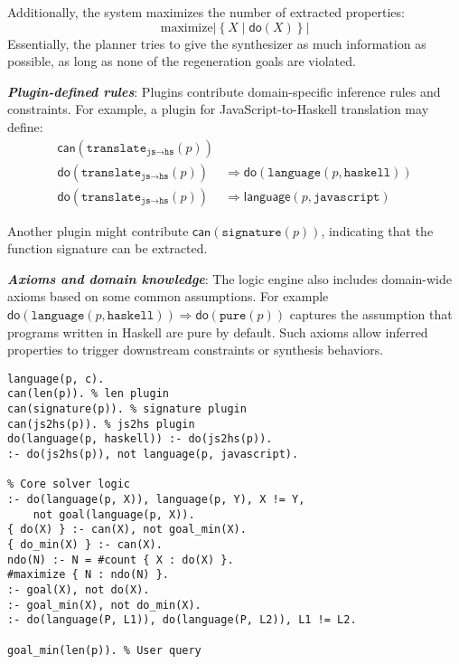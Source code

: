 \documentclass[sigplan]{acmart}
\def\eg{{\em e.g.}, }
\newcommand{\sys}{{\scshape Kv{\textalpha}sir}\xspace}
\newcommand{\heading}[1]{\vspace{2pt}\noindent\textbf{\emph{#1}}:\enspace}
\newcommand{\ttt}[1]{\texttt{#1}}
\begin{document}
Additionally, the system maximizes the number of extracted properties:
\[
\text{maximize} \left|\left\{ X \mid \mathsf{do}(X) \right\}\right|
\]
Essentially, the planner tries to give the synthesizer as much information
as possible, as long as none of the regeneration goals are violated.

\heading{Plugin-defined rules}
Plugins contribute domain-specific inference rules and constraints. For example, a plugin for JavaScript-to-Haskell translation may define:
\begin{align*}
\mathsf{can}(\texttt{translate}_{\texttt{js} \rightarrow \texttt{hs}}(p)) & \\
\mathsf{do}(\texttt{translate}_{\texttt{js} \rightarrow \texttt{hs}}(p)) &\Rightarrow \mathsf{do}(\texttt{language}(p, \texttt{haskell})) \\
\mathsf{do}(\texttt{translate}_{\texttt{js} \rightarrow \texttt{hs}}(p)) &\Rightarrow \mathsf{language}(p, \texttt{javascript})
\end{align*}

Another plugin might contribute $\mathsf{can}(\texttt{signature}(p))$, indicating that the function signature can be extracted.

\heading{Axioms and domain knowledge}
The logic engine also includes domain-wide axioms based on some common assumptions.
For example
$\mathsf{do}(\texttt{language}(p, \texttt{haskell})) \Rightarrow \mathsf{do}(\texttt{pure}(p))$
captures the assumption that programs written in Haskell are pure by default.
Such axioms allow inferred properties to trigger downstream constraints or synthesis behaviors.

\begin{listing}
  \begin{verbatim}
language(p, c).
can(len(p)). % len plugin
can(signature(p)). % signature plugin
can(js2hs(p)). % js2hs plugin
do(language(p, haskell)) :- do(js2hs(p)).
:- do(js2hs(p)), not language(p, javascript).

% Core solver logic
:- do(language(p, X)), language(p, Y), X != Y,
    not goal(language(p, X)).
{ do(X) } :- can(X), not goal_min(X).
{ do_min(X) } :- can(X).
ndo(N) :- N = #count { X : do(X) }.
#maximize { N : ndo(N) }.
:- goal(X), not do(X).
:- goal_min(X), not do_min(X).
:- do(language(P, L1)), do(language(P, L2)), L1 != L2.

goal_min(len(p)). % User query
\end{verbatim}
  \caption{\textbf{Example \sys logic program.}
  This is a lightly simplified version of the logic program that produces the plan for the idiomatization task~(\cref{sec:example}). 
  The program contains facts coming from (1) the input program (it is written in C),
  (2) three plugins (\ttt{len}, \ttt{signature}, and \ttt{js2hs}),
  (3) axioms from the logic engine (\eg a program can have one language, an analysis will be applied only if possible, all goals must be satisfied), and
  (4) the user query (the user wants to minimize the length of the program).
  }
  \label{lst:logic-example}
\end{listing}
\end{document}
